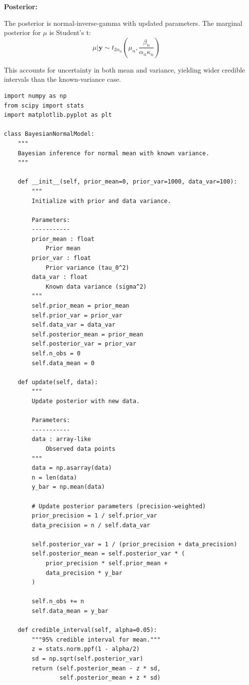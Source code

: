 \textbf{Posterior:}

The posterior is normal-inverse-gamma with updated parameters. The marginal posterior for $\mu$ is Student's t:
\begin{equation}
\mu | \mathbf{y} \sim t_{2\alpha_n}\left(\mu_n, \frac{\beta_n}{\alpha_n \kappa_n}\right)
\end{equation}

This accounts for uncertainty in both mean and variance, yielding wider credible intervals than the known-variance case.

\lstset{language=Python, caption=Normal-Normal Model for Revenue Per User}
\begin{lstlisting}
import numpy as np
from scipy import stats
import matplotlib.pyplot as plt

class BayesianNormalModel:
    """
    Bayesian inference for normal mean with known variance.
    """

    def __init__(self, prior_mean=0, prior_var=1000, data_var=100):
        """
        Initialize with prior and data variance.

        Parameters:
        -----------
        prior_mean : float
            Prior mean
        prior_var : float
            Prior variance (tau_0^2)
        data_var : float
            Known data variance (sigma^2)
        """
        self.prior_mean = prior_mean
        self.prior_var = prior_var
        self.data_var = data_var
        self.posterior_mean = prior_mean
        self.posterior_var = prior_var
        self.n_obs = 0
        self.data_mean = 0

    def update(self, data):
        """
        Update posterior with new data.

        Parameters:
        -----------
        data : array-like
            Observed data points
        """
        data = np.asarray(data)
        n = len(data)
        y_bar = np.mean(data)

        # Update posterior parameters (precision-weighted)
        prior_precision = 1 / self.prior_var
        data_precision = n / self.data_var

        self.posterior_var = 1 / (prior_precision + data_precision)
        self.posterior_mean = self.posterior_var * (
            prior_precision * self.prior_mean +
            data_precision * y_bar
        )

        self.n_obs += n
        self.data_mean = y_bar

    def credible_interval(self, alpha=0.05):
        """95% credible interval for mean."""
        z = stats.norm.ppf(1 - alpha/2)
        sd = np.sqrt(self.posterior_var)
        return (self.posterior_mean - z * sd,
                self.posterior_mean + z * sd)


\end{lstlisting}

